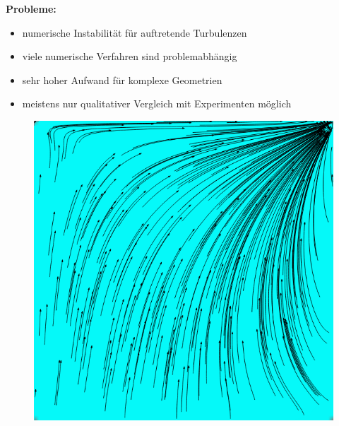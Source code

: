 		\begin{frame}
			\textbf{Probleme:}
			\begin{itemize}[label=$\circ$]
				\item numerische Instabilität für auftretende Turbulenzen
				\item viele numerische Verfahren sind problemabhängig
				\item sehr hoher Aufwand für komplexe Geometrien
				\item meistens nur qualitativer Vergleich mit Experimenten möglich
			\end{itemize}

			\begin{figure}
				\includegraphics[scale = 0.2]{images/re-1000-64.png}
			\end{figure}
		\end{frame}

	

